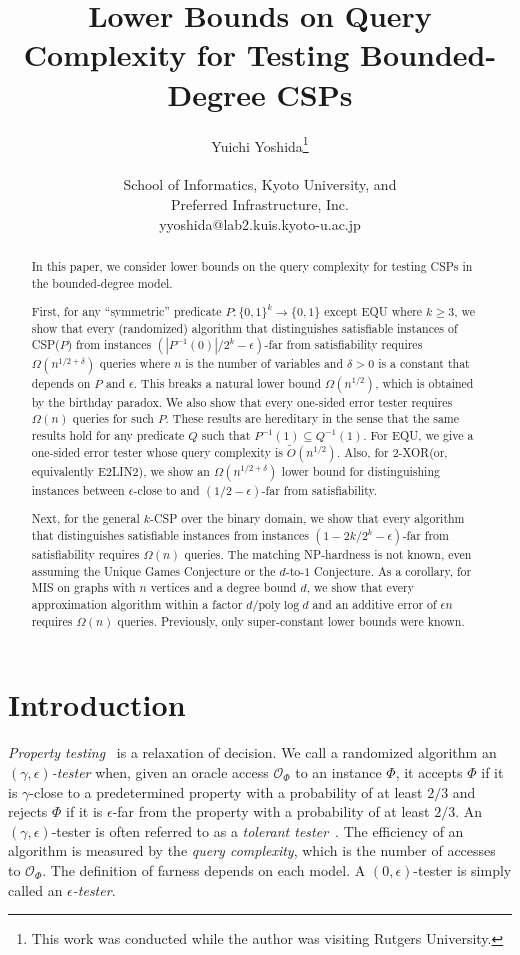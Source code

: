 \documentclass[letterpaper,11pt]{article}
\title{Lower Bounds on Query Complexity for Testing Bounded-Degree CSPs}
\author{Yuichi Yoshida\thanks{This work was conducted while the author was visiting Rutgers University.}\\\\
  School of Informatics, Kyoto University, and\\ Preferred Infrastructure, Inc.\\yyoshida@lab2.kuis.kyoto-u.ac.jp}
\date{}
\newcommand{\poly}{\mathrm{poly}}
\newcommand{\calo}{\mathcal{O}}
\newcommand{\bit}{\{0,1\}}
\newcommand{\mis}{\textsf{MIS}\xspace}
\newcommand{\kcsp}{\textsf{$k$-CSP}\xspace}
\newcommand{\csp}[1]{\textsf{CSP}(#1)\xspace}
\newcommand{\equ}{\textsf{EQU}\xspace}
\newcommand{\txor}{\textsf{$2$-XOR}\xspace}
\begin{document}
\setcounter{page}{0}
\maketitle
\begin{abstract}
  In this paper, we consider lower bounds on the query complexity for testing CSPs in the bounded-degree model.

  First, for any ``symmetric'' predicate $P:\bit^{k}\to \bit$ except \equ where $k\geq 3$, 
  we show that every (randomized) algorithm that distinguishes satisfiable instances of \csp{$P$} from instances $(|P^{-1}(0)|/2^k-\epsilon)$-far from satisfiability requires $\Omega(n^{1/2+\delta})$ queries where $n$ is the number of variables and $\delta>0$ is a constant that depends on $P$ and $\epsilon$.
  This breaks a natural lower bound $\Omega(n^{1/2})$, which is obtained by the birthday paradox.
  We also show that every one-sided error tester requires $\Omega(n)$ queries for such $P$.
  These results are hereditary in the sense that the same results hold for any predicate $Q$ such that $P^{-1}(1)\subseteq Q^{-1}(1)$.
  For \equ, we give a one-sided error tester whose query complexity is $\tilde{O}(n^{1/2})$.
  Also, for \txor (or, equivalently \textsf{E2LIN2}), 
  we show an $\Omega(n^{1/2+\delta})$ lower bound for distinguishing instances between $\epsilon$-close to and $(1/2-\epsilon)$-far from satisfiability.

  Next, for the general \kcsp over the binary domain,
  we show that every algorithm that distinguishes satisfiable instances from instances $(1-2k/2^k-\epsilon)$-far from satisfiability requires $\Omega(n)$ queries.
  The matching NP-hardness is not known, even assuming the Unique Games Conjecture or the $d$-to-$1$ Conjecture.
  As a corollary, for \mis on graphs with $n$ vertices and a degree bound $d$,
  we show that every approximation algorithm within a factor $d/\poly\log d$ and an additive error of $\epsilon n$ requires $\Omega(n)$ queries.
  Previously, only super-constant lower bounds were known.
\end{abstract}
\newpage
\section{Introduction}
\textit{Property testing}~\cite{GGR98} is a relaxation of decision.
We call a randomized algorithm an \textit{$(\gamma,\epsilon)$-tester} when, 
given an oracle access $\calo_\Phi$ to an instance $\Phi$, 
it accepts $\Phi$ if it is $\gamma$-close to a predetermined property with a probability of at least $2/3$ and rejects $\Phi$ if it is $\epsilon$-far from the property with a probability of at least $2/3$.
An $(\gamma,\epsilon)$-tester is often referred to as a \textit{tolerant tester}~\cite{PRR06}.
The efficiency of an algorithm is measured by the \textit{query complexity}, which is the number of accesses to $\calo_\Phi$.
The definition of farness depends on each model.
A $(0,\epsilon)$-tester is simply called an \textit{$\epsilon$-tester}.
\end{document}
